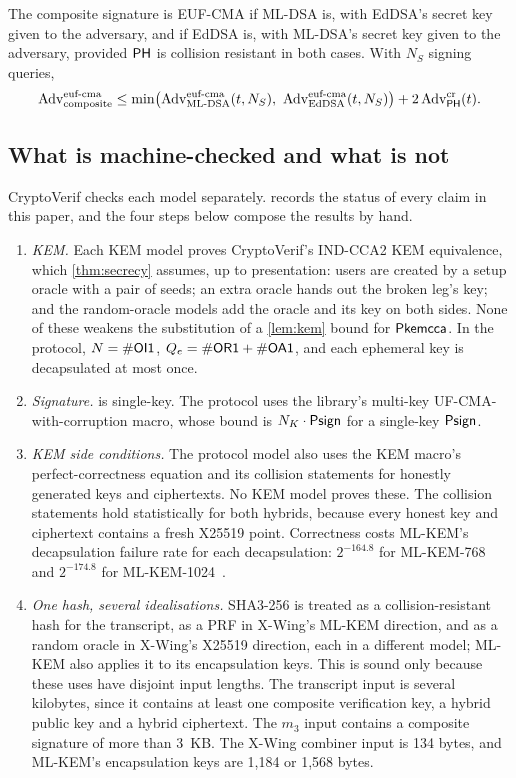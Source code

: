 \begin{lemma}\label{lem:sig}
The composite signature is EUF-CMA if ML-DSA is, with EdDSA's secret key
given to the adversary, and if EdDSA is, with ML-DSA's secret key given to
the adversary, provided $\mathsf{PH}$ is collision resistant in both cases. With $N_S$
signing queries,
\[
  \Adv^{\text{euf-cma}}_{\text{composite}}
  \le \min\bigl(\Adv^{\text{euf-cma}}_{\text{ML-DSA}}(t, N_S),\ \Adv^{\text{euf-cma}}_{\text{EdDSA}}(t, N_S)\bigr)
  + 2\,\Adv^{\text{cr}}_{\PH}(t).
\]
\end{lemma}

\subsection{What is machine-checked and what is not}\label{sec:status}

CryptoVerif checks each model separately.  records the
status of every claim in this paper, and the four steps below compose the
results by hand.

\begin{enumerate}
  \item \emph{KEM.} Each KEM model proves CryptoVerif's IND-CCA2 KEM
  equivalence, which \cref{thm:secrecy} assumes, up to presentation: users
  are created by a setup oracle with a pair of seeds; an extra oracle hands
  out the broken leg's key; and the random-oracle models add the oracle and
  its key on both sides. None of these weakens the substitution of a
  \cref{lem:kem} bound for $\mathsf{Pkemcca}$. In the protocol, $N = \#\mathsf{OI1}$,
  $Q_e = \#\mathsf{OR1} + \#\mathsf{OA1}$, and each ephemeral key is decapsulated
  at most once.
  \item \emph{Signature.}  is single-key. The protocol uses the
  library's multi-key UF-CMA-with-corruption macro, whose bound is
  $N_K \cdot \mathsf{Psign}$ for a single-key $\mathsf{Psign}$.
  \item \emph{KEM side conditions.} The protocol model also uses the KEM
  macro's perfect-correctness equation and its collision statements for
  honestly generated keys and ciphertexts. No KEM model proves these. The
  collision statements hold statistically for both hybrids, because every
  honest key and ciphertext contains a fresh X25519 point. Correctness costs
  ML-KEM's decapsulation failure rate for each decapsulation: $2^{-164.8}$
  for ML-KEM-768 and $2^{-174.8}$ for ML-KEM-1024~\cite[Table~1]{FIPS203}.
  \item \emph{One hash, several idealisations.} SHA3-256 is treated as a
  collision-resistant hash for the transcript, as a PRF in X-Wing's ML-KEM
  direction, and as a random oracle in X-Wing's X25519 direction, each in a
  different model; ML-KEM also applies it to its encapsulation keys. This is
  sound only because these uses have disjoint input lengths. The transcript
  input is several kilobytes, since it contains at least one composite
  verification key, a hybrid public key and a hybrid ciphertext. The $m_3$
  input contains a composite signature of more than 3~KB. The X-Wing combiner
  input is 134 bytes, and ML-KEM's encapsulation keys are 1,184 or 1,568
  bytes.
\end{enumerate}

